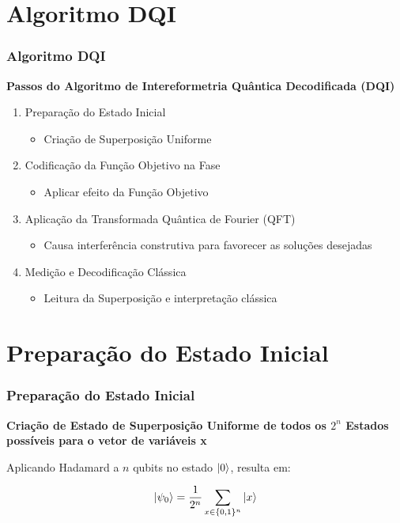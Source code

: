 \documentclass[aspectratio=169]{beamer}
\begin{document}
\section{Algoritmo DQI}


\begin{frame}
    \frametitle{Algoritmo DQI}

    \textbf{Passos do Algoritmo de Intereformetria Quântica Decodificada (DQI)}

    \vspace{2cm}

    \begin{enumerate}
        \item Preparação do Estado Inicial
            \begin{itemize}
                \item Criação de Superposição Uniforme
            \end{itemize}
        \item Codificação da Função Objetivo na Fase
            \begin{itemize}
                \item Aplicar efeito da Função Objetivo
            \end{itemize}
        \item Aplicação da Transformada Quântica de Fourier (QFT)
            \begin{itemize}
                \item Causa interferência construtiva para favorecer as soluções desejadas
            \end{itemize}
        \item Medição e Decodificação Clássica
            \begin{itemize}
                \item Leitura da Superposição e interpretação clássica
            \end{itemize}
    \end{enumerate}
\end{frame}


\section{Preparação do Estado Inicial}

\begin{frame}
    \frametitle{Preparação do Estado Inicial}

    \textbf{Criação de Estado de Superposição Uniforme de todos os $2^n$ Estados possíveis para o vetor de variáveis x}

    \vspace{2cm}

    Aplicando Hadamard a $n$ qubits no estado $\ket{0}$, resulta em:

    \[
        \ket{\psi_0}=\frac{1}{2^n} \sum_{x\in\{0,1\}^n}\ket{x}
    \]
\end{frame}
\end{document}
